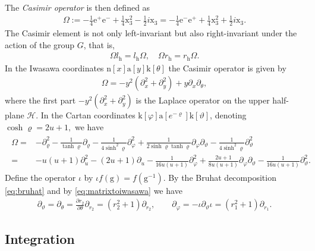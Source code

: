 \documentclass[12pt]{amsart}
\theoremstyle{definition}
\theoremstyle{remark}
\numberwithin{equation}{section}
\newcommand{\1}{{\mathbf 1}}
\renewcommand{\H}{\mathcal{H}}
\newcommand{\g}{\mathrm{g}}
\newcommand{\h}{\mathrm{h}}
\begin{document}
The \emph{Casimir operator} is then defined as
\begin{align} \label{eq:casimirdef}
    \Omega := -\frac{1}{4}  \mathrm{e}^{+}  \mathrm{e}^{-} + \frac{1}{4}\mathrm{x}_3^2 - \frac{1}{2} i \mathrm{x}_3 =  -\frac{1}{4}   \mathrm{e}^{-}\mathrm{e}^{+}  + \frac{1}{4}\mathrm{x}_3^2 + \frac{1}{2} i \mathrm{x}_3.
\end{align}
The Casimir element is not only left-invariant but also right-invariant under the action of the group $G$, that is,
\begin{align}\label{eq:Omegalrcommute}
    \Omega l_\h =  l_\h \Omega, \quad  \Omega r_\h =  r_\h \Omega.
\end{align}
In the Iwasawa coordinates $ \mathrm{n}[x] \mathrm{a}[y] \mathrm{k}[\theta]$ the Casimir operator is given by
\begin{align} \label{eq:casimiriwasawa}
    \Omega = -y^2 (\partial_x^2 + \partial_y^2) + y \partial_x \partial_\theta,
\end{align}
where the first part $-y^2 (\partial_x^2 + \partial_y^2)$ is the Laplace operator on the upper half-plane $\H$.
In the Cartan coordinates $\mathrm{k}[\varphi] \mathrm{a}[e^{-\varrho}]\mathrm{k}[\vartheta]$, denoting  $\cosh \varrho =2u+1,$ we have
\begin{align} \label{eq:casimircartan}
\begin{split}
    \Omega =&  - \partial_\varrho^2 - \frac{1}{\tanh \varrho} \partial_\varrho -\frac{1}{4\sinh^2 \varrho} \partial_\varphi^2  +\frac{1}{2 \sinh\varrho \tanh \varrho} \partial_\varphi \partial_\vartheta - \frac{1}{4 \sinh^2 \varrho}  \partial_\vartheta^2 \\
        =& -u(u+1) \partial_u^2 - (2u+1) \partial_u - \frac{1}{16u(u+1)}  \partial_\varphi^2   +   \frac{2u+1}{8 u(u+1)}\partial_\varphi \partial_\vartheta -  \frac{1}{16u(u+1)} \partial_\vartheta^2 .
\end{split}
\end{align}
Define the operator $\iota $ by $\iota f (\g) = f(\g^{-1})$. By the Bruhat decomposition \eqref{eq:bruhat} and by \eqref{eq:matrixtoiwasawa} we have
\begin{align} \label{eq:cartantobruhat}
 \partial_\vartheta = \partial_\theta = \frac{\partial r_2}{\partial \theta} \partial_{r_{2}} = (r_2^2+1) \partial_{r_2},   \quad \quad   \partial_\varphi = -\iota \partial_\vartheta \iota  =  (r_1^2+1) \partial_{r_1}.
\end{align}

\subsection{Integration}
\end{document}
